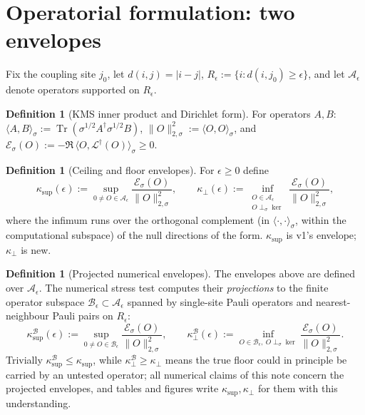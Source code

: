 \documentclass[11pt,a4paper]{article}
\theoremstyle{plain}
\theoremstyle{definition}
\newtheorem{definition}[theorem]{Definition}
\theoremstyle{remark}
\newcommand{\Tr}{\operatorname{Tr}}
\newcommand{\eps}{\epsilon}
\newcommand{\ksup}{\kappa_{\sup}}
\newcommand{\kfl}{\kappa_{\perp}}
\begin{document}
\section{Operatorial formulation: two envelopes}

Fix the coupling site $j_0$, let $d(i,j) = |i-j|$, $R_\eps := \{i : d(i,j_0)
\ge \eps\}$, and let $\mathcal{A}_\eps$ denote operators supported on
$R_\eps$.

\begin{definition}[KMS inner product and Dirichlet form]
For operators $A, B$: $\langle A, B\rangle_\sigma := \Tr(\sigma^{1/2}
A^\dagger \sigma^{1/2} B)$, $\|O\|^2_{2,\sigma} := \langle O,
O\rangle_\sigma$, and $\mathcal{E}_\sigma(O) := -\Re\,\langle O,
\mathcal{L}^\dagger(O)\rangle_\sigma \ge 0$.
\end{definition}

\begin{definition}[Ceiling and floor envelopes]\label{def:envelopes}
For $\eps \ge 0$ define
\begin{equation}
\ksup(\eps) := \sup_{0 \neq O \in \mathcal{A}_\eps}
\frac{\mathcal{E}_\sigma(O)}{\|O\|^2_{2,\sigma}},
\qquad
\kfl(\eps) := \inf_{\substack{O \in \mathcal{A}_\eps \\ O \perp_\sigma
\ker}}\frac{\mathcal{E}_\sigma(O)}{\|O\|^2_{2,\sigma}},
\end{equation}
where the infimum runs over the orthogonal complement (in
$\langle\cdot,\cdot\rangle_\sigma$, within the computational subspace) of the
null directions of the form. $\ksup$ is v1's envelope; $\kfl$ is new.
\end{definition}

\begin{definition}[Projected numerical envelopes]\label{def:projected}
The envelopes above are defined over $\mathcal{A}_\eps$. The numerical stress
test computes their \emph{projections} to the finite operator subspace
$\mathcal{B}_\eps \subset \mathcal{A}_\eps$ spanned by single-site Pauli
operators and nearest-neighbour Pauli pairs on $R_\eps$:
\begin{equation}
\ksup^{\mathcal{B}}(\eps) := \sup_{0\neq O\in\mathcal{B}_\eps}
\frac{\mathcal{E}_\sigma(O)}{\|O\|^2_{2,\sigma}},
\qquad
\kfl^{\mathcal{B}}(\eps) := \inf_{O\in\mathcal{B}_\eps,\ O\perp_\sigma\ker}
\frac{\mathcal{E}_\sigma(O)}{\|O\|^2_{2,\sigma}}.
\end{equation}
Trivially $\ksup^{\mathcal{B}} \le \ksup$, while $\kfl^{\mathcal{B}} \ge \kfl$
means the true floor could in principle be carried by an untested operator;
all numerical claims of this note concern the projected envelopes, and tables
and figures write $\ksup, \kfl$ for them with this understanding.
\end{definition}
\end{document}
